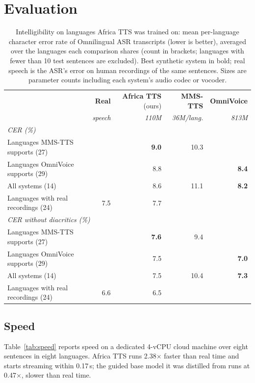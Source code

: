 \documentclass[10pt,twocolumn]{article}
\newcommand{\att}{Africa TTS}
\newcommand{\xrtturbopython}{2.38}
\newcommand{\ttfaturbopython}{0.17}
\newcommand{\xrtfullguidedpython}{0.47}
\begin{document}
\section{Evaluation}
\begin{table}[t]
\centering
\small
\begin{tabular}{lrrrr}
\toprule
 & \textbf{Real} & \textbf{Africa TTS} (ours) & \textbf{MMS-TTS} & \textbf{OmniVoice} \\
 & \textit{speech} & \textit{110M} & \textit{36M/lang.} & \textit{813M} \\
\midrule
\multicolumn{5}{l}{\textit{CER (\%)}} \\
Languages MMS-TTS supports (27) &  & \textbf{9.0} & 10.3 &  \\
Languages OmniVoice supports (29) &  & 8.8 &  & \textbf{8.4} \\
All systems (14) &  & 8.6 & 11.1 & \textbf{8.2} \\
Languages with real recordings (24) & 7.5 & 7.7 &  &  \\
\midrule
\multicolumn{5}{l}{\textit{CER without diacritics (\%)}} \\
Languages MMS-TTS supports (27) &  & \textbf{7.6} & 9.4 &  \\
Languages OmniVoice supports (29) &  & 7.5 &  & \textbf{7.0} \\
All systems (14) &  & 7.5 & 10.4 & \textbf{7.3} \\
Languages with real recordings (24) & 6.6 & 6.5 &  &  \\
\bottomrule
\end{tabular}
\caption{Intelligibility on languages Africa TTS was trained on: mean per-language character error rate of Omnilingual ASR transcripts (lower is better), averaged over the languages each comparison shares (count in brackets; languages with fewer than 10 test sentences are excluded). Best synthetic system in bold; real speech is the ASR's error on human recordings of the same sentences. Sizes are parameter counts including each system's audio codec or vocoder.}
\label{tab:averages}
\end{table}

\subsection{Speed}
Table~\ref{tab:speed} reports speed on a dedicated 4-vCPU cloud machine over eight sentences in
eight languages. \att{} runs \xrtturbopython{}$\times$ faster than real time and starts
streaming within \ttfaturbopython{}\,s; the guided base model it was distilled from runs at
\xrtfullguidedpython{}$\times$, slower than real time.
\end{document}
